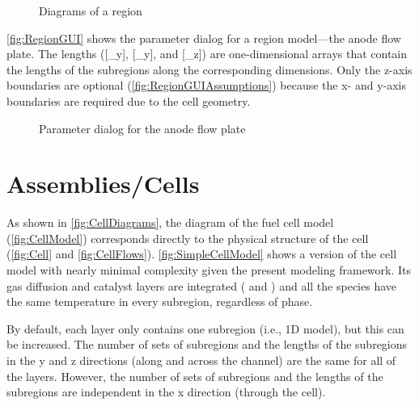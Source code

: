 \begin{figure}[htbp]
  \quad
  \caption{Diagrams of a region}
  \label{fig:Region}
\end{figure}


\autoref{fig:RegionGUI} shows the parameter dialog for a region model---the anode flow plate.  The lengths ([_y], [_y], and [_z]) are one-dimensional arrays that contain the lengths of the subregions along the corresponding dimensions.  Only the z-axis boundaries are optional (\autoref{fig:RegionGUIAssumptions}) because the x- and y-axis boundaries are required due to the cell geometry.


\begin{figure}[htbp]
  \quad
  \caption{Parameter dialog for the anode flow plate}
  \label{fig:RegionGUI}
\end{figure}


\FloatBarrier %
\section{Assemblies\slash{}Cells}


As shown in \autoref{fig:CellDiagrams}, the diagram of the fuel cell model (\autoref{fig:CellModel}) corresponds directly to the physical structure of the cell (\autoref{fig:Cell} and \autoref{fig:CellFlows}).  \autoref{fig:SimpleCellModel} shows a version of the cell model with nearly minimal complexity given the present modeling framework.  Its gas diffusion and catalyst layers are integrated ( and ) and all the species have the same temperature in every subregion, regardless of phase.

By default, each layer only contains one subregion (i.e., 1D model), but this can be increased.  The number of sets of subregions and the lengths of the subregions in the y and z directions (along and across the channel) are the same for all of the layers.  However, the number of sets of subregions and the lengths of the subregions are independent in the x direction (through the cell).


